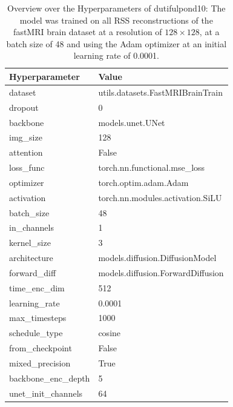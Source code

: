 \begin{table}
    \centering
    \caption[Hyperparameter Overview dutifulpond10]{Overview over the Hyperparameters of dutifulpond10: The model was trained on all RSS reconstructions of the fastMRI brain dataset at a resolution of $128\times 128$, at a batch size of 48 and using the Adam optimizer at an initial learning rate of 0.0001.}
    \label{tab:dutifulpond10}
    \begin{tabular}{l l}
        Hyperparameter       & Value                             \\
        \hline
        dataset              & utils.datasets.FastMRIBrainTrain  \\
        dropout              & 0                                 \\
        backbone             & models.unet.UNet                  \\
        img\_size            & 128                               \\
        attention            & False                             \\
        loss\_func           & torch.nn.functional.mse\_loss     \\
        optimizer            & torch.optim.adam.Adam             \\
        activation           & torch.nn.modules.activation.SiLU  \\
        batch\_size          & 48                                \\
        in\_channels         & 1                                 \\
        kernel\_size         & 3                                 \\
        architecture         & models.diffusion.DiffusionModel   \\
        forward\_diff        & models.diffusion.ForwardDiffusion \\
        time\_enc\_dim       & 512                               \\
        learning\_rate       & 0.0001                            \\
        max\_timesteps       & 1000                              \\
        schedule\_type       & cosine                            \\
        from\_checkpoint     & False                             \\
        mixed\_precision     & True                              \\
        backbone\_enc\_depth & 5                                 \\
        unet\_init\_channels & 64                                \\
    \end{tabular}
\end{table}

